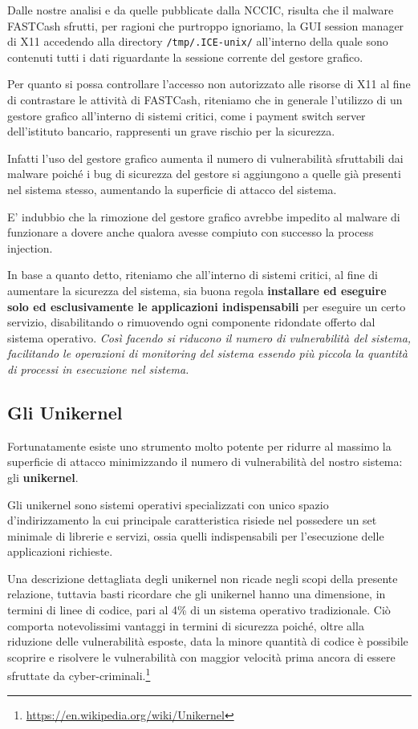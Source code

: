 \documentclass[10pt,a4paper, titlepage]{report}
\begin{document}
Dalle nostre analisi e da quelle pubblicate dalla NCCIC, risulta che il malware FASTCash sfrutti, per ragioni che purtroppo ignoriamo, la GUI session manager di X11 accedendo alla directory \texttt{/tmp/.ICE-unix/} all'interno della quale sono contenuti tutti i dati riguardante la sessione corrente del gestore grafico.

Per quanto si possa controllare l'accesso non autorizzato alle risorse di X11 al fine di contrastare le attività di FASTCash, riteniamo che in generale l'utilizzo di un gestore grafico all'interno di sistemi critici, come i  payment switch server dell'istituto bancario, rappresenti un grave rischio per la sicurezza. 

Infatti l'uso del gestore grafico aumenta il numero di vulnerabilità sfruttabili dai malware poiché i bug di sicurezza del gestore si aggiungono a quelle già presenti nel sistema stesso, aumentando la superficie di attacco del sistema. 

E' indubbio che la rimozione del gestore grafico avrebbe impedito al malware di funzionare a dovere anche qualora avesse compiuto con successo la process injection.

In base a quanto detto, riteniamo che all'interno di sistemi critici, al fine di aumentare la sicurezza del sistema, sia buona regola \textbf{installare ed eseguire solo ed esclusivamente le applicazioni indispensabili} per eseguire un certo servizio, disabilitando o rimuovendo ogni componente ridondate offerto dal sistema operativo. \textit{Così facendo si riducono il numero di vulnerabilità del sistema, facilitando le operazioni di monitoring del sistema essendo più piccola la quantità di processi in esecuzione nel sistema.}

\subsection{Gli Unikernel}

Fortunatamente esiste uno strumento molto potente per ridurre al massimo la superficie di attacco minimizzando il numero di vulnerabilità del nostro sistema: gli \textbf{unikernel}. 

Gli unikernel sono sistemi operativi specializzati con unico spazio d'indirizzamento la cui principale caratteristica risiede nel possedere un set minimale di librerie e servizi, ossia quelli indispensabili per  l'esecuzione delle applicazioni richieste. 

Una descrizione dettagliata degli unikernel non ricade negli scopi della presente relazione, tuttavia basti ricordare che gli unikernel hanno una dimensione, in termini di linee di codice, pari al 4\% di un sistema operativo tradizionale. Ciò comporta notevolissimi vantaggi in termini di sicurezza poiché, oltre alla riduzione delle vulnerabilità esposte, data la minore quantità di codice è possibile scoprire e risolvere le vulnerabilità 
con maggior velocità prima ancora di essere sfruttate da cyber-criminali.\footnote{\url{https://en.wikipedia.org/wiki/Unikernel}}
\end{document}
